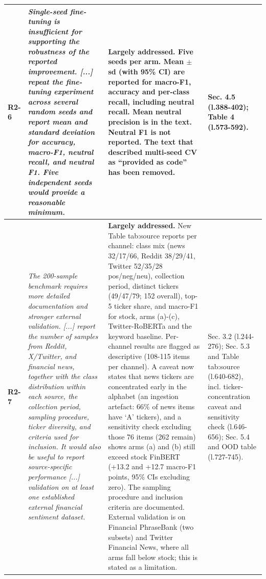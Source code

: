 \documentclass[10pt]{article}
\begin{document}
\begin{longtable}{>{\raggedright\arraybackslash}p{1.1cm}>{\raggedright\arraybackslash}p{8.2cm}>{\raggedright\arraybackslash}p{9.0cm}>{\raggedright\arraybackslash}p{6.0cm}}
\textbf{R2-6} & \emph{Single-seed fine-tuning is insufficient for supporting the robustness of the reported improvement. [...] repeat the fine-tuning experiment across several random seeds and report mean and standard deviation for accuracy, macro-F1, neutral recall, and neutral F1. Five independent seeds would provide a reasonable minimum.} & \textbf{Largely addressed.} Five seeds per arm. Mean $\pm$ sd (with 95\% CI) are reported for macro-F1, accuracy and per-class recall, including neutral recall. Mean neutral precision is in the text. Neutral F1 is not reported. The text that described multi-seed CV as ``provided as code'' has been removed. & Sec. 4.5 (l.388-402); Table 4 (l.573-592). \\ \midrule
\textbf{R2-7} & \emph{The 200-sample benchmark requires more detailed documentation and stronger external validation. [...] report the number of samples from Reddit, X/Twitter, and financial news, together with the class distribution within each source, the collection period, sampling procedure, ticker diversity, and criteria used for inclusion. It would also be useful to report source-specific performance [...] validation on at least one established external financial sentiment dataset.} & \textbf{Largely addressed.} New Table tab:source reports per channel: class mix (news 32/17/66, Reddit 38/29/41, Twitter 52/35/28 pos/neg/neu), collection period, distinct tickers (49/47/79; 152 overall), top-5 ticker share, and macro-F1 for stock, arms (a)-(c), Twitter-RoBERTa and the keyword baseline. Per-channel results are flagged as descriptive (108-115 items per channel). A caveat now states that news tickers are concentrated early in the alphabet (an ingestion artefact: 66\% of news items have `A' tickers), and a sensitivity check excluding those 76 items (262 remain) shows arms (a) and (b) still exceed stock FinBERT (+13.2 and +12.7 macro-F1 points, 95\% CIs excluding zero). The sampling procedure and inclusion criteria are documented. External validation is on Financial PhraseBank (two subsets) and Twitter Financial News, where all arms fall below stock; this is stated as a limitation. & Sec. 3.2 (l.244-276); Sec. 5.3 and Table tab:source (l.640-682), incl. ticker-concentration caveat and sensitivity check (l.646-656); Sec. 5.4 and OOD table (l.727-745). \\ \midrule

\end{longtable}
\end{document}
